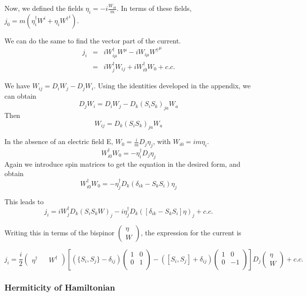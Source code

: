 Now, we defined the fields $\eta_i = -i \frac{W_{i0}}{m}$.  In terms of these fields,
$j_0 =  m (\eta_i^\dagger  W^i + \eta_i {W^\dagger}^i )$. 

We can do the same to find the vector part of the current.
\begin{eqnarray*}
	j_i &=& i W_{i \mu}^\dagger W^{\mu} - i W_{i \mu} {W^{\dagger}}^\mu 	\\
	&=&	i W_j^\dagger W_{ij}  + i W_{i0}^\dagger W_0 + c.c.
\end{eqnarray*}

We have $W_{ij} = D_i W_j - D_j W_i$.  Using the identities developed in the appendix, we can obtain
\[ D_j W_i = D_i W_j - D_k(S_i S_k)_{ja} W_a 	\]
Then
\[ W_{ij} = D_k (S_i S_k)_{ja} W_a 	\]

In the absence of an electric field E, $W_{0} = \frac{i}{m} D_j \eta_j$, with $W_{i0} = i m \eta_i$.
\[	W_{i0}^\dagger W_0 = - \eta_i^\dagger D_j \eta_j 	\]
Again we introduce spin matrices to get the equation in the desired form, and obtain
\[	W_{i0}^\dagger W_0 = - \eta_j^\dagger D_k (\delta_{ik} - S_k S_i) \eta_j 	\]

This leads to
\[ j_i = i W_j^\dagger D_k (S_i S_k W)_j - i \eta_j^\dagger D_k ([\delta_{ik} - S_k S_i]\eta)_j + c.c. \]

Writing this in terms of the bispinor $\begin{pmatrix}\eta \\ W\end{pmatrix}$, the expression for the current is

\begin{equation}	j_i	=
		\frac{i}{2} \begin{pmatrix}\eta^\dagger && W^\dagger \end{pmatrix} \left [
		(\{S_i, S_j\} - \delta_{ij})  
		\begin{pmatrix} 
			1 & 0 \\
			0 & 1 \\ 
		\end{pmatrix}
		- ([S_i, S_j] +\delta_{ij})	\begin{pmatrix} 1 & 0 \\ 0 & -1 \\ \end{pmatrix}
		\right ]
		D_j \begin{pmatrix}\eta \\ W\end{pmatrix} + c.c.
\end{equation}


\subsubsection{Hermiticity of Hamiltonian}


